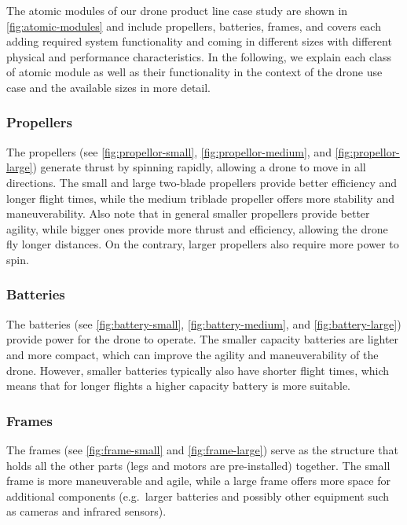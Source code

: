 \documentclass[sigconf,review]{acmart}
\begin{document}
The atomic modules of our drone product line case study are shown in \cref{fig:atomic-modules} and include propellers, batteries, frames, and covers each adding required system functionality and coming in different sizes with different physical and performance characteristics.
In the following, we explain each class of atomic module as well as their functionality in the context of the drone use case and the available sizes in more detail.

\subsubsection*{Propellers}
\label{sec:propellers}

The propellers (see \cref{fig:propellor-small}, \cref{fig:propellor-medium}, and \cref{fig:propellor-large}) generate thrust by spinning rapidly, allowing a drone to move in all directions. 
The small and large two-blade propellers provide better efficiency and longer flight times, while the medium triblade propeller offers more stability and maneuverability. 
Also note that in general smaller propellers provide better agility, while bigger ones provide more thrust and efficiency, allowing the drone fly longer distances.
On the contrary, larger propellers also require more power to spin.

\subsubsection*{Batteries}
\label{sec:batteries}

The batteries (see \cref{fig:battery-small}, \cref{fig:battery-medium}, and \cref{fig:battery-large}) provide power for the drone to operate. 
The smaller capacity batteries are lighter and more compact, which can improve the agility and maneuverability of the drone. 
However, smaller batteries typically also have shorter flight times, which means that for longer flights a higher capacity battery is more suitable.

\subsubsection*{Frames}
\label{sec:frames}

The frames (see \cref{fig:frame-small} and \cref{fig:frame-large}) serve as the structure that holds all the other parts (legs and motors are pre-installed) together. 
The small frame is more maneuverable and agile, while a large frame offers more space for additional components (e.g.~larger batteries and possibly other equipment such as cameras and infrared sensors).
\end{document}

